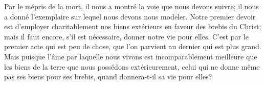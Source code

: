 Par le mépris de la mort,
	il nous a montré la voie que nous devons suivre;
	il nous a donné l’exemplaire sur lequel nous devons nous modeler.
Notre premier devoir est d’employer charitablement nos biens extérieurs
	en faveur des brebis du Christ;
	mais il faut encore, s’il est nécessaire, donner notre vie pour elles.
C’est par le premier acte qui est peu de chose,
	que l’on parvient au dernier qui est plus grand.
Mais puisque l’âme par laquelle nous vivons
	est incomparablement meilleure que les biens de la terre
		que nous possédons extérieurement,
	celui qui ne donne même pas ses biens pour ses brebis,
	quand donnera-t-il sa vie pour elles?
